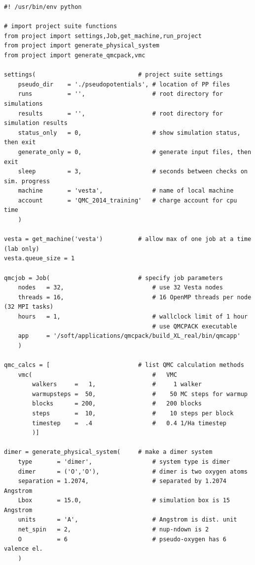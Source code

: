 \begin{shaded}
\begin{verbatim}
#! /usr/bin/env python

# import project suite functions
from project import settings,Job,get_machine,run_project 
from project import generate_physical_system
from project import generate_qmcpack,vmc

settings(                             # project suite settings
    pseudo_dir    = './pseudopotentials', # location of PP files
    runs          = '',                   # root directory for simulations
    results       = '',                   # root directory for simulation results
    status_only   = 0,                    # show simulation status, then exit
    generate_only = 0,                    # generate input files, then exit
    sleep         = 3,                    # seconds between checks on sim. progress
    machine       = 'vesta',              # name of local machine
    account       = 'QMC_2014_training'   # charge account for cpu time
    ) 

vesta = get_machine('vesta')          # allow max of one job at a time (lab only)
vesta.queue_size = 1

qmcjob = Job(                         # specify job parameters
    nodes   = 32,                         # use 32 Vesta nodes
    threads = 16,                         # 16 OpenMP threads per node (32 MPI tasks)
    hours   = 1,                          # wallclock limit of 1 hour
                                          # use QMCPACK executable
    app     = '/soft/applications/qmcpack/build_XL_real/bin/qmcapp'
    )

qmc_calcs = [                         # list QMC calculation methods
    vmc(                                  #   VMC
        walkers     =   1,                #     1 walker
        warmupsteps =  50,                #    50 MC steps for warmup
        blocks      = 200,                #   200 blocks
        steps       =  10,                #    10 steps per block
        timestep    =  .4                 #   0.4 1/Ha timestep
        )]

dimer = generate_physical_system(     # make a dimer system
    type       = 'dimer',                 # system type is dimer
    dimer      = ('O','O'),               # dimer is two oxygen atoms
    separation = 1.2074,                  # separated by 1.2074 Angstrom
    Lbox       = 15.0,                    # simulation box is 15 Angstrom 
    units      = 'A',                     # Angstrom is dist. unit
    net_spin   = 2,                       # nup-ndown is 2
    O          = 6                        # pseudo-oxygen has 6 valence el.
    )


\end{verbatim}
\end{shaded}
